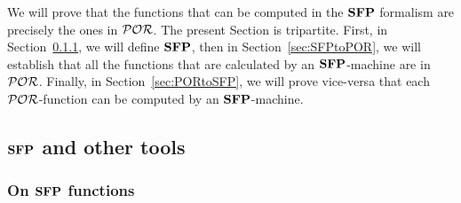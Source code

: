 \begin{conditional}{\notappendix}

  We will prove that the functions
  that can be computed in the $\mathbf{SFP}$
  formalism are precisely the ones
  in $\mathcal{POR}$.
  The present Section is tripartite.
  First, in Section~\ref{sec:SFP}, we will define $\mathbf{SFP}$,
  then in Section~\ref{sec:SFPtoPOR},
  we will establish that all the functions that
  are calculated by an $\mathbf{SFP}$-machine are in
  $\mathcal{POR}$.
  Finally, in Section~\ref{sec:PORtoSFP},
  we will prove vice-versa that each $\mathcal{POR}$-function
  can be computed by an
  $\mathbf{SFP}$-machine.
\end{conditional}










\subsection{$\mathbf{SFP}$ and other tools}

\subsubsection{On $\mathbf{SFP}$ functions}
\label{sec:SFP}


